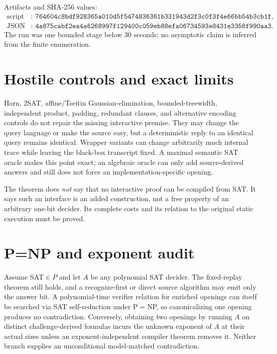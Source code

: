 \documentclass[11pt]{article}
\begin{document}
Artifacts and SHA-256 values:
\begin{align*}
\text{script}&:\ \texttt{764604c8bdf928365a010d5f5474836361b331943d2f3c0f3f4e66bb54b3cb1f},\\
\text{JSON}&:\ \texttt{4a875cabf2ea4a6268997f129400c059eb88efa06734593e8431e3358f990aa3}.
\end{align*}
The run was one bounded stage below 30 seconds; no asymptotic claim is inferred
from the finite enumeration.

\section*{Hostile controls and exact limits}

Horn, 2SAT, affine/Tseitin Gaussian-elimination, bounded-treewidth, independent
product, padding, redundant clauses, and alternative encoding controls do not
repair the missing interactive premise.  They may change the query language
or make the source easy, but a deterministic reply to an identical query
remains identical.  Wrapper variants can change arbitrarily much internal
trace while leaving the black-box transcript fixed.  A maximal semantic SAT
oracle makes this point exact; an algebraic oracle can only add source-derived
answers and still does not force an implementation-specific opening.

The theorem does \emph{not} say that no interactive proof can be compiled from
SAT.  It says such an interface is an added construction, not a free property
of an arbitrary one-bit decider.  Its complete costs and its relation to the
original static execution must be proved.

\section*{P=NP and exponent audit}

Assume SAT$\in P$ and let $A$ be any polynomial SAT decider.  The fixed-replay
theorem still holds, and a recognize-first or direct source algorithm may emit
only the answer bit.  A polynomial-time verifier relation for enriched
openings can itself be searched via SAT self-reduction under P$=$NP, so
canonicalizing one opening produces no contradiction.  Conversely, obtaining
two openings by running $A$ on distinct challenge-derived formulas incurs the
unknown exponent of $A$ at their actual sizes unless an exponent-independent
compiler theorem removes it.  Neither branch supplies an unconditional
model-matched contradiction.
\end{document}
